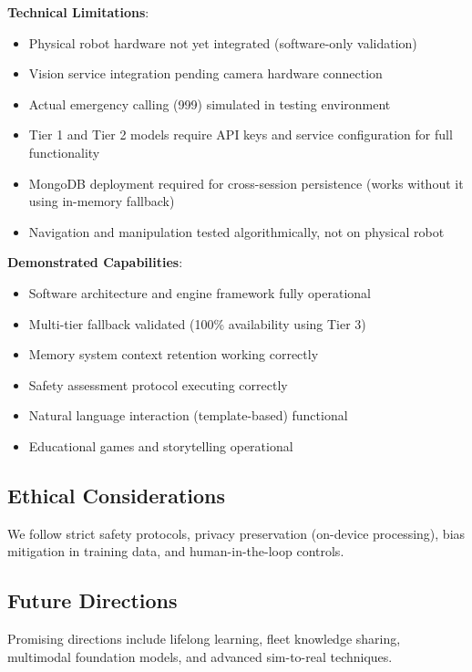 \documentclass[conference]{IEEEtran}
\begin{document}
\textbf{Technical Limitations}:
\begin{itemize}
    \item Physical robot hardware not yet integrated (software-only validation)
    \item Vision service integration pending camera hardware connection
    \item Actual emergency calling (999) simulated in testing environment
    \item Tier 1 and Tier 2 models require API keys and service configuration for full functionality
    \item MongoDB deployment required for cross-session persistence (works without it using in-memory fallback)
    \item Navigation and manipulation tested algorithmically, not on physical robot
\end{itemize}

\textbf{Demonstrated Capabilities}:
\begin{itemize}
    \item Software architecture and engine framework fully operational
    \item Multi-tier fallback validated (100\% availability using Tier 3)
    \item Memory system context retention working correctly
    \item Safety assessment protocol executing correctly
    \item Natural language interaction (template-based) functional
    \item Educational games and storytelling operational
\end{itemize}

\subsection{Ethical Considerations}

We follow strict safety protocols, privacy preservation (on-device processing), bias mitigation in training data, and human-in-the-loop controls.

\subsection{Future Directions}

Promising directions include lifelong learning, fleet knowledge sharing, multimodal foundation models, and advanced sim-to-real techniques.

\end{document}
